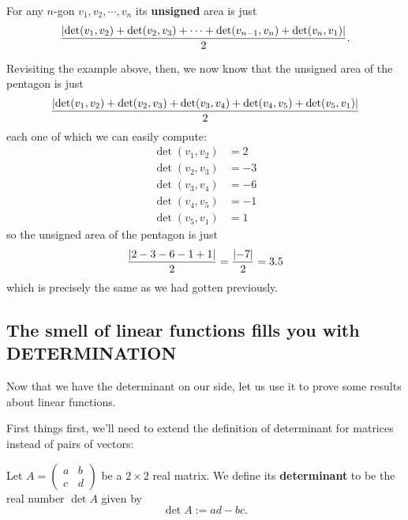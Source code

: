 \begin{cor}
	For any $n$-gon $v_1,v_2,\cdots,v_n$ its \textbf{unsigned} area is just
	\[\frac{\left\vert\det(v_1,v_2)+\det(v_2,v_3)+\cdots+\det(v_{n-1},v_n)+\det(v_n,v_1)\right\vert}{2}.\]
\end{cor}

\begin{ex}
	Revisiting the example above, then, we now know that the unsigned area of the pentagon is just 
	\[\frac{\left\vert\det(v_1,v_2)+\det(v_2,v_3)+\det(v_3,v_4)+\det(v_4,v_5)+\det(v_5,v_1)\right\vert}{2}\]each one of which we can easily compute:
	\begin{align*}
		\det(v_1,v_2)&=2\\
		\det(v_2,v_3)&=-3\\
		\det(v_3,v_4)&=-6\\
		\det(v_4,v_5)&=-1\\
		\det(v_5,v_1)&=1
	\end{align*}so the unsigned area of the pentagon is just 
	\[\frac{\left\vert2-3-6-1+1\right\vert}{2}=\frac{\left\vert-7\right\vert}{2}=3.5\]which is precisely the same as we had gotten previously.
\end{ex}

\newpage
\subsection{The smell of linear functions fills you with DETERMINATION}

Now that we have the determinant on our side, let us use it to prove some results about linear functions.

First things first, we'll need to extend the definition of determinant for matrices instead of pairs of vectors:

\begin{df}
	Let $A=\begin{pmatrix}
	a&b\\c&d
	\end{pmatrix}$ be a $2\times 2$ real matrix. We define its \textbf{determinant} to be the real number $\det A$ given by
	\[\det A:=ad-bc.\]
\end{df}

